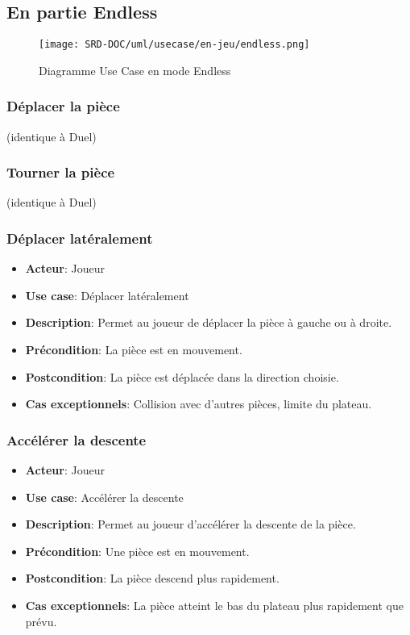 \documentclass{article}
\begin{document}
\subsection{En partie Endless}

\begin{figure}[H]
    \centering
    \texttt{[image: SRD-DOC/uml/usecase/en-jeu/endless.png]}
    \caption{Diagramme Use Case en mode Endless}
    \label{fig:Endless}
\end{figure}

\subsubsection*{Déplacer la pièce} (identique à Duel)
\subsubsection*{Tourner la pièce} (identique à Duel)

\subsubsection*{Déplacer latéralement}
\begin{itemize}
    \item \textbf{Acteur}: Joueur
    \item \textbf{Use case}: Déplacer latéralement
    \item \textbf{Description}: Permet au joueur de déplacer la pièce à gauche ou à droite.
    \item \textbf{Précondition}: La pièce est en mouvement.
    \item \textbf{Postcondition}: La pièce est déplacée dans la direction choisie.
    \item \textbf{Cas exceptionnels}: Collision avec d'autres pièces, limite du plateau.
\end{itemize}

\subsubsection*{Accélérer la descente}
\begin{itemize}
    \item \textbf{Acteur}: Joueur
    \item \textbf{Use case}: Accélérer la descente
    \item \textbf{Description}: Permet au joueur d'accélérer la descente de la pièce.
    \item \textbf{Précondition}: Une pièce est en mouvement.
    \item \textbf{Postcondition}: La pièce descend plus rapidement.
    \item \textbf{Cas exceptionnels}: La pièce atteint le bas du plateau plus rapidement que prévu.
\end{itemize}
\end{document}
